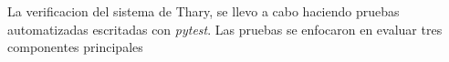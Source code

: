 La verificacion del sistema de Thary, se llevo a cabo haciendo pruebas automatizadas escritadas con \textit{pytest}. Las pruebas se enfocaron en evaluar tres componentes principales  